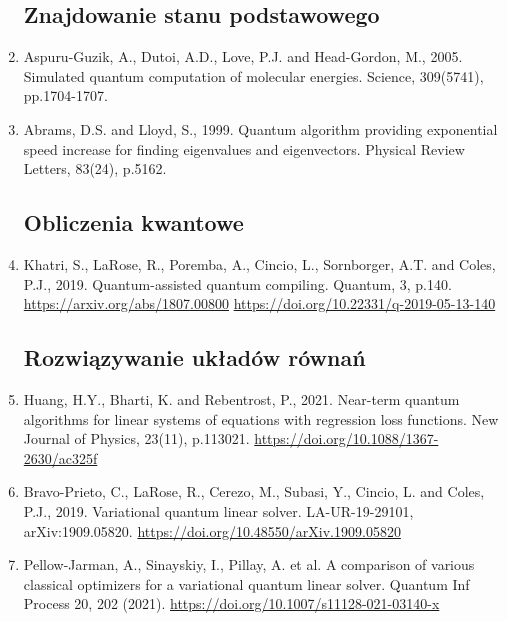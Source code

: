 \documentclass[a4paper,11pt]{article}
\begin{document}
\begin{enumerate}
\def\labelenumi{\arabic{enumi}.}


\subsection*{Znajdowanie stanu podstawowego}

\item Aspuru-Guzik, A., Dutoi, A.D., Love, P.J. and Head-Gordon, M., 2005. Simulated quantum computation of molecular energies. Science, 309(5741), pp.1704-1707.

\item Abrams, D.S. and Lloyd, S., 1999. Quantum algorithm providing exponential speed increase for finding eigenvalues and eigenvectors. Physical Review Letters, 83(24), p.5162.


\subsection*{Obliczenia kwantowe}

\item Khatri, S., LaRose, R., Poremba, A., Cincio, L., Sornborger, A.T. and Coles, P.J., 2019. Quantum-assisted quantum compiling. Quantum, 3, p.140. \url{https://arxiv.org/abs/1807.00800} \url{https://doi.org/10.22331/q-2019-05-13-140}

\subsection*{Rozwiązywanie układów równań}

\item Huang, H.Y., Bharti, K. and Rebentrost, P., 2021. Near-term quantum algorithms for linear systems of equations with regression loss functions. New Journal of Physics, 23(11), p.113021. \url{https://doi.org/10.1088/1367-2630/ac325f}


\item Bravo-Prieto, C., LaRose, R., Cerezo, M., Subasi, Y., Cincio, L. and Coles, P.J., 2019. Variational quantum linear solver. LA-UR-19-29101, arXiv:1909.05820. \url{https://doi.org/10.48550/arXiv.1909.05820}

\item Pellow-Jarman, A., Sinayskiy, I., Pillay, A. et al. A comparison of various classical optimizers for a variational quantum linear solver. Quantum Inf Process 20, 202 (2021). \url{https://doi.org/10.1007/s11128-021-03140-x}



\end{enumerate}
\end{document}
